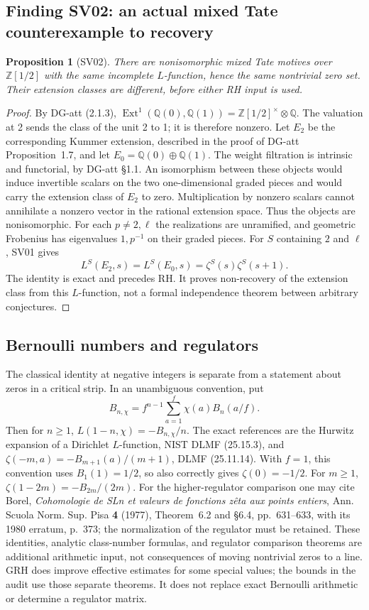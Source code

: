 \documentclass[11pt,a4paper]{article}
\newtheorem{proposition}[theorem]{Proposition}
\theoremstyle{definition}
\begin{document}
\subsection{Finding SV02: an actual mixed Tate counterexample to recovery}
\label{SV02}
\begin{proposition}[SV02]
There are nonisomorphic mixed Tate motives over \(\mathbb Z[1/2]\) with the
same incomplete \(L\)-function, hence the same nontrivial zero set.  Their
extension classes are different, before either RH input is used.
\end{proposition}
\begin{proof}
By DG-att (2.1.3),
\(\operatorname{Ext}^1(\mathbb Q(0),\mathbb Q(1))=
\mathbb Z[1/2]^\times\otimes\mathbb Q\).
The valuation at 2 sends the class of the unit 2 to 1; it is therefore
nonzero.  Let \(E_2\) be the corresponding Kummer extension, described in
the proof of DG-att Proposition~1.7, and let
\(E_0=\mathbb Q(0)\oplus\mathbb Q(1)\).
The weight filtration is intrinsic and functorial, by DG-att \S1.1.
An isomorphism between these objects would induce invertible scalars on the
two one-dimensional graded pieces and would carry the extension class of
\(E_2\) to zero.  Multiplication by nonzero scalars cannot annihilate a
nonzero vector in the rational extension space.  Thus the objects are
nonisomorphic.  For each \(p\neq2,\ell\) the realizations are unramified,
and geometric Frobenius has eigenvalues \(1,p^{-1}\) on their graded pieces.
For \(S\) containing \(2\) and \(\ell\), SV01 gives
\[
 L^S(E_2,s)=L^S(E_0,s)=\zeta^S(s)\zeta^S(s+1).
\]
The identity is exact and precedes RH.  It proves non-recovery of the
extension class from this \(L\)-function, not a formal independence theorem
between arbitrary conjectures.
\end{proof}

\subsection{Bernoulli numbers and regulators}
The classical identity at negative integers is separate from a statement
about zeros in a critical strip.  In an unambiguous convention, put
\[
 B_{n,\chi}=f^{n-1}\sum_{a=1}^{f}\chi(a)B_n(a/f).
\]
Then for \(n\geq1\),
\(L(1-n,\chi)=-B_{n,\chi}/n\).  The exact references are the Hurwitz
expansion of a Dirichlet \(L\)-function, NIST DLMF (25.15.3), and
\(\zeta(-m,a)=-B_{m+1}(a)/(m+1)\), DLMF (25.11.14).  With \(f=1\), this
convention uses \(B_1(1)=1/2\), so also correctly gives \(\zeta(0)=-1/2\).
For \(m\geq1\), \(\zeta(1-2m)=-B_{2m}/(2m)\).
For the higher-regulator comparison one may cite Borel, \emph{Cohomologie
de SLn et valeurs de fonctions z\^eta aux points entiers}, Ann. Scuola
Norm. Sup. Pisa \textbf{4} (1977), Theorem~6.2 and \S6.4, pp.~631--633,
with its 1980 erratum, p.~373; the normalization of the regulator must be
retained.  These identities, analytic class-number formulas, and regulator
comparison theorems are additional arithmetic input, not consequences of moving
nontrivial zeros to a line.  GRH does improve effective estimates for some
special values; the bounds in the audit use those separate theorems.  It
does not replace exact Bernoulli arithmetic or determine a regulator matrix.
\end{document}
